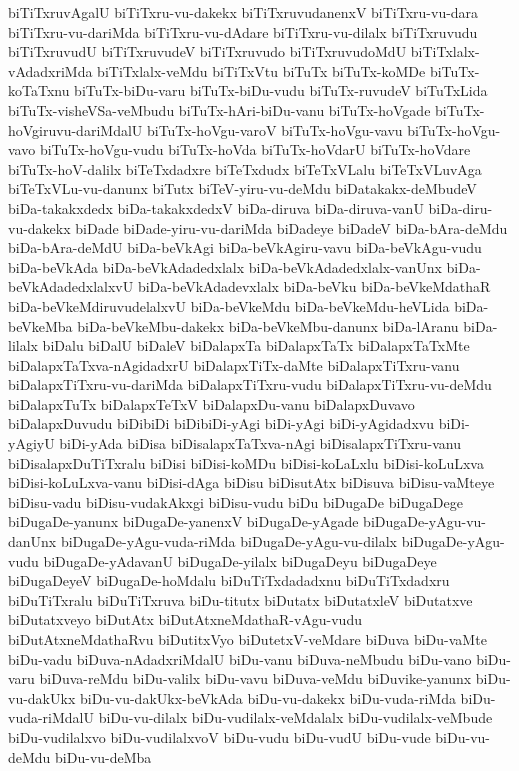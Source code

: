 {biTiTxruvAgalU
biTiTxru-vu-dakekx
biTiTxruvudanenxV
biTiTxru-vu-dara
biTiTxru-vu-dariMda
biTiTxru-vu-dAdare
biTiTxru-vu-dilalx
biTiTxruvudu
biTiTxruvudU
biTiTxruvudeV
biTiTxruvudo
biTiTxruvudoMdU
biTiTxlalx-vAdadxriMda
biTiTxlalx-veMdu
biTiTxVtu
biTuTx
biTuTx-koMDe
biTuTx-koTaTxnu
biTuTx-biDu-varu
biTuTx-biDu-vudu
biTuTx-ruvudeV
biTuTxLida
biTuTx-visheVSa-veMbudu
biTuTx-hAri-biDu-vanu
biTuTx-hoVgade
biTuTx-hoVgiruvu-dariMdalU
biTuTx-hoVgu-varoV
biTuTx-hoVgu-vavu
biTuTx-hoVgu-vavo
biTuTx-hoVgu-vudu
biTuTx-hoVda
biTuTx-hoVdarU
biTuTx-hoVdare
biTuTx-hoV-dalilx
biTeTxdadxre
biTeTxdudx
biTeTxVLalu
biTeTxVLuvAga
biTeTxVLu-vu-danunx
biTutx
biTeV-yiru-vu-deMdu
biDatakakx-deMbudeV
biDa-takakxdedx
biDa-takakxdedxV
biDa-diruva
biDa-diruva-vanU
biDa-diru-vu-dakekx
biDade
biDade-yiru-vu-dariMda
biDadeye
biDadeV
biDa-bAra-deMdu
biDa-bAra-deMdU
biDa-beVkAgi
biDa-beVkAgiru-vavu
biDa-beVkAgu-vudu
biDa-beVkAda
biDa-beVkAdadedxlalx
biDa-beVkAdadedxlalx-vanUnx
biDa-beVkAdadedxlalxvU
biDa-beVkAdadevxlalx
biDa-beVku
biDa-beVkeMdathaR
biDa-beVkeMdiruvudelalxvU
biDa-beVkeMdu
biDa-beVkeMdu-heVLida
biDa-beVkeMba
biDa-beVkeMbu-dakekx
biDa-beVkeMbu-danunx
biDa-lAranu
biDa-lilalx
biDalu
biDalU
biDaleV
biDalapxTa
biDalapxTaTx
biDalapxTaTxMte
biDalapxTaTxva-nAgidadxrU
biDalapxTiTx-daMte
biDalapxTiTxru-vanu
biDalapxTiTxru-vu-dariMda
biDalapxTiTxru-vudu
biDalapxTiTxru-vu-deMdu
biDalapxTuTx
biDalapxTeTxV
biDalapxDu-vanu
biDalapxDuvavo
biDalapxDuvudu
biDibiDi
biDibiDi-yAgi
biDi-yAgi
biDi-yAgidadxvu
biDi-yAgiyU
biDi-yAda
biDisa
biDisalapxTaTxva-nAgi
biDisalapxTiTxru-vanu
biDisalapxDuTiTxralu
biDisi
biDisi-koMDu
biDisi-koLaLxlu
biDisi-koLuLxva
biDisi-koLuLxva-vanu
biDisi-dAga
biDisu
biDisutAtx
biDisuva
biDisu-vaMteye
biDisu-vadu
biDisu-vudakAkxgi
biDisu-vudu
biDu
biDugaDe
biDugaDege
biDugaDe-yanunx
biDugaDe-yanenxV
biDugaDe-yAgade
biDugaDe-yAgu-vu-danUnx
biDugaDe-yAgu-vuda-riMda
biDugaDe-yAgu-vu-dilalx
biDugaDe-yAgu-vudu
biDugaDe-yAdavanU
biDugaDe-yilalx
biDugaDeyu
biDugaDeye
biDugaDeyeV
biDugaDe-hoMdalu
biDuTiTxdadadxnu
biDuTiTxdadxru
biDuTiTxralu
biDuTiTxruva
biDu-titutx
biDutatx
biDutatxleV
biDutatxve
biDutatxveyo
biDutAtx
biDutAtxneMdathaR-vAgu-vudu
biDutAtxneMdathaRvu
biDutitxVyo
biDutetxV-veMdare
biDuva
biDu-vaMte
biDu-vadu
biDuva-nAdadxriMdalU
biDu-vanu
biDuva-neMbudu
biDu-vano
biDu-varu
biDuva-reMdu
biDu-valilx
biDu-vavu
biDuva-veMdu
biDuvike-yanunx
biDu-vu-dakUkx
biDu-vu-dakUkx-beVkAda
biDu-vu-dakekx
biDu-vuda-riMda
biDu-vuda-riMdalU
biDu-vu-dilalx
biDu-vudilalx-veMdalalx
biDu-vudilalx-veMbude
biDu-vudilalxvo
biDu-vudilalxvoV
biDu-vudu
biDu-vudU
biDu-vude
biDu-vu-deMdu
biDu-vu-deMba
}
